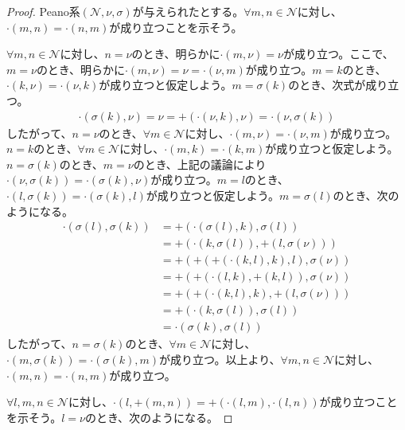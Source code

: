 \documentclass[dvipdfmx]{jsarticle}
\begin{document}
\begin{proof}
Peano系$\left( \mathcal{N,}\nu,\sigma \right)$が与えられたとする。$\forall m,n \in \mathcal{N}$に対し、$\cdot (m,n) = \cdot (n,m)$が成り立つことを示そう。\par
$\forall m,n \in \mathcal{N}$に対し、$n = \nu$のとき、明らかに$\cdot (m,\nu) = \nu$が成り立つ。ここで、$m = \nu$のとき、明らかに$\cdot (m,\nu) = \nu = \cdot (\nu,m)$が成り立つ。$m = k$のとき、$\cdot (k,\nu) = \cdot (\nu,k)$が成り立つと仮定しよう。$m = \sigma(k)$のとき、次式が成り立つ。
\begin{align*}
\cdot \left( \sigma(k),\nu \right) = \nu = + \left( \cdot (\nu,k),\nu \right) = \cdot \left( \nu,\sigma(k) \right)
\end{align*}
したがって、$n = \nu$のとき、$\forall m \in \mathcal{N}$に対し、$\cdot (m,\nu) = \cdot (\nu,m)$が成り立つ。$n = k$のとき、$\forall m \in \mathcal{N}$に対し、$\cdot (m,k) = \cdot (k,m)$が成り立つと仮定しよう。$n = \sigma(k)$のとき、$m = \nu$のとき、上記の議論により$\cdot \left( \nu,\sigma(k) \right) = \cdot \left( \sigma(k),\nu \right)$が成り立つ。$m = l$のとき、$\cdot \left( l,\sigma(k) \right) = \cdot \left( \sigma(k),l \right)$が成り立つと仮定しよう。$m = \sigma(l)$のとき、次のようになる。
\begin{align*}
\cdot \left( \sigma(l),\sigma(k) \right) &= + \left( \cdot \left( \sigma(l),k \right),\sigma(l) \right)\\
&= + \left( \cdot \left( k,\sigma(l) \right), + \left( l,\sigma(\nu) \right) \right)\\
&= + \left( + \left( + \left( \cdot (k,l),k \right),l \right),\sigma(\nu) \right)\\
&= + \left( + \left( \cdot (l,k), + (k,l) \right),\sigma(\nu) \right)\\
&= + \left( + \left( \cdot (k,l),k \right), + \left( l,\sigma(\nu) \right) \right)\\
&= + \left( \cdot \left( k,\sigma(l) \right),\sigma(l) \right)\\
&= \cdot \left( \sigma(k),\sigma(l) \right)
\end{align*}
したがって、$n = \sigma(k)$のとき、$\forall m \in \mathcal{N}$に対し、$\cdot \left( m,\sigma(k) \right) = \cdot \left( \sigma(k),m \right)$が成り立つ。以上より、$\forall m,n \in \mathcal{N}$に対し、$\cdot (m,n) = \cdot (n,m)$が成り立つ。\par
$\forall l,m,n \in \mathcal{N}$に対し、$\cdot \left( l, + (m,n) \right) = + \left( \cdot (l,m), \cdot (l,n) \right)$が成り立つことを示そう。$l = \nu$のとき、次のようになる。

\end{proof}
\end{document}
